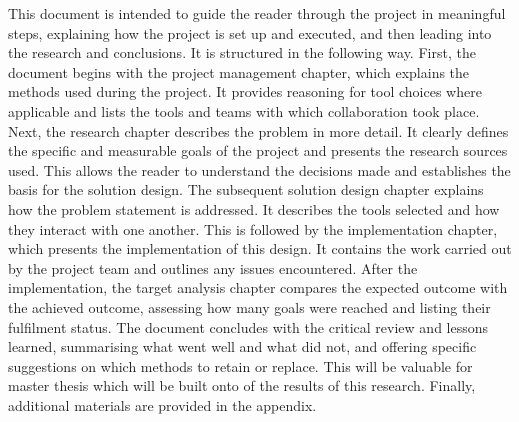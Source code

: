This document is intended to guide the reader through the project in meaningful steps, explaining how the project is set up and executed, and then leading into the research and conclusions. It is structured in the following way. First, the document begins with the project management chapter, which explains the methods used during the project. It provides reasoning for tool choices where applicable and lists the tools and teams with which collaboration took place.
Next, the research chapter describes the problem in more detail. It clearly defines the specific and measurable goals of the project and presents the research sources used. This allows the reader to understand the decisions made and establishes the basis for the solution design. 
The subsequent solution design chapter explains how the problem statement is addressed. It describes the tools selected and how they interact with one another. This is followed by the implementation chapter, which presents the implementation of this design. It contains the work carried out by the project team and outlines any issues encountered. After the implementation, the target analysis chapter compares the expected outcome with the achieved outcome, assessing how many goals were reached and listing their fulfilment status. 
The document concludes with the critical review and lessons learned, summarising what went well and what did not, and offering specific suggestions on which methods to retain or replace. This will be valuable for master thesis which will be built onto of the results of this research. Finally, additional materials are provided in the appendix.